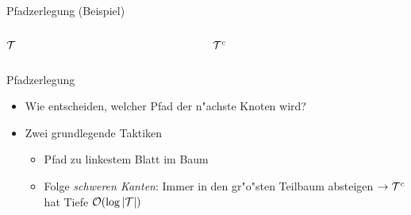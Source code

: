 \documentclass[ngerman,hyperref={pdfpagelabels=true}]{beamer}
\begin{document}
\begin{frame}{Pfadzerlegung (Beispiel)}

\begin{columns}[T] %
\begin{column}{.48\textwidth}

\centering
$\mathcal{T}$\\[1em]
%

\end{column}%
\hfill%
\begin{column}{.48\textwidth}

\centering
$\mathcal{T}^c$\\[1em]
%

\end{column}%
\end{columns}

\end{frame}

\begin{frame}{Pfadzerlegung}
\begin{itemize}
\item Wie entscheiden, welcher Pfad der n"achste Knoten wird?
\item Zwei grundlegende Taktiken
\begin{itemize}
\item Pfad zu linkestem Blatt im Baum
\item Folge \emph{schweren Kanten}: Immer in den gr"o"sten Teilbaum absteigen
$\rightarrow \mathcal{T}^c$ hat Tiefe $\mathcal{O}(\log |\mathcal{T}|)$
\end{itemize}
\end{itemize}
\end{frame}

\newcommand{\edgelabel}[2]{edge from parent node[draw=none,#1]{\lstinline|#2|}}
\end{document}
